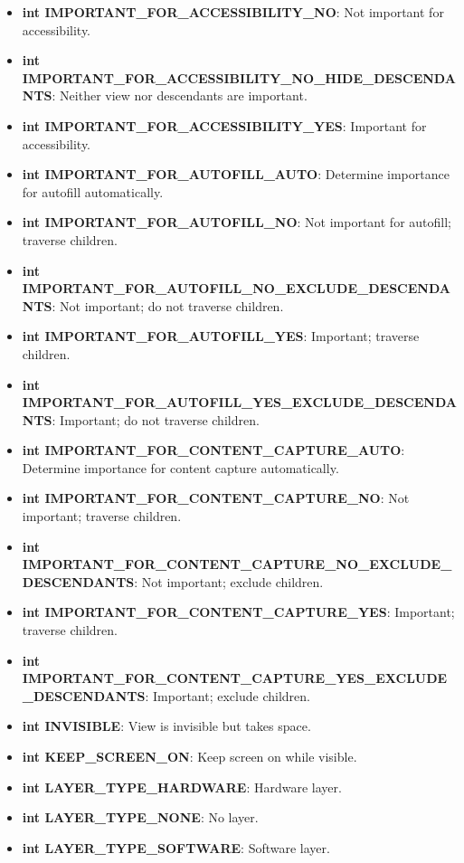 \documentclass{report}
\begin{document}
\begin{itemize}
\begin{itemize}
                \item \textbf{int IMPORTANT\_FOR\_ACCESSIBILITY\_NO}: Not important for accessibility.
                \item \textbf{int IMPORTANT\_FOR\_ACCESSIBILITY\_NO\_HIDE\_DESCENDANTS}: Neither view nor descendants are important.
                \item \textbf{int IMPORTANT\_FOR\_ACCESSIBILITY\_YES}: Important for accessibility.
                \item \textbf{int IMPORTANT\_FOR\_AUTOFILL\_AUTO}: Determine importance for autofill automatically.
                \item \textbf{int IMPORTANT\_FOR\_AUTOFILL\_NO}: Not important for autofill; traverse children.
                \item \textbf{int IMPORTANT\_FOR\_AUTOFILL\_NO\_EXCLUDE\_DESCENDANTS}: Not important; do not traverse children.
                \item \textbf{int IMPORTANT\_FOR\_AUTOFILL\_YES}: Important; traverse children.
                \item \textbf{int IMPORTANT\_FOR\_AUTOFILL\_YES\_EXCLUDE\_DESCENDANTS}: Important; do not traverse children.
                \item \textbf{int IMPORTANT\_FOR\_CONTENT\_CAPTURE\_AUTO}: Determine importance for content capture automatically.
                \item \textbf{int IMPORTANT\_FOR\_CONTENT\_CAPTURE\_NO}: Not important; traverse children.
                \item \textbf{int IMPORTANT\_FOR\_CONTENT\_CAPTURE\_NO\_EXCLUDE\_DESCENDANTS}: Not important; exclude children.
                \item \textbf{int IMPORTANT\_FOR\_CONTENT\_CAPTURE\_YES}: Important; traverse children.
                \item \textbf{int IMPORTANT\_FOR\_CONTENT\_CAPTURE\_YES\_EXCLUDE\_DESCENDANTS}: Important; exclude children.
                \item \textbf{int INVISIBLE}: View is invisible but takes space.
                \item \textbf{int KEEP\_SCREEN\_ON}: Keep screen on while visible.
                \item \textbf{int LAYER\_TYPE\_HARDWARE}: Hardware layer.
                \item \textbf{int LAYER\_TYPE\_NONE}: No layer.
                \item \textbf{int LAYER\_TYPE\_SOFTWARE}: Software layer.

\end{itemize}
\end{itemize}
\end{document}
